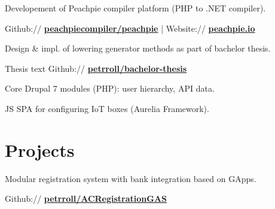\documentclass[a4paper]{deedy-resume} %
\begin{document}
\begin{minipage}[t]{0.62\textwidth}
\begin{tightitemize}
\item Developement of Peachpie compiler platform (PHP to .NET compiler).
\item Github:// \href{https://github.com/peachpiecompiler/peachpie}{\bf peachpiecompiler/peachpie} | Website:// \href{https://www.peachpie.io/}{\bf peachpie.io}
\item Design \& impl. of lowering generator methods as part of bachelor thesis.
\item Thesis text Github:// \href{https://github.com/petrroll/bachelor-thesis}{\bf petrroll/bachelor-thesis}
\end{tightitemize}

\sectionspace %



\begin{tightitemize}
\item Core Drupal 7 modules (PHP): user hierarchy, API data.
\item JS SPA for configuring IoT boxes (Aurelia Framework).
\end{tightitemize}

\sectionspace %

\section{Projects}


\emptyLocation %
\begin{tightitemize}
\item Modular registration system with bank integration based on GApps.
\item Github:// \href{https://github.com/petrroll/ACRegistrationGAS}{\bf petrroll/ACRegistrationGAS}
\end{tightitemize}


\end{minipage}
\end{document}

